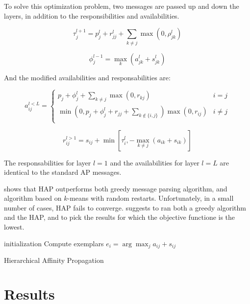 \documentclass{ipol}
\begin{document}
To solve this optimization problem, two messages are passed up and down the
layers, in addition to the responsibilities and availabilities.

\begin{equation}
\tau_j^{l + 1} = p^l_j + r_{jj}^l + \sum_{k \neq j} \max (0, \rho^l_{jk})
\end{equation}

\begin{equation}
\phi_j^{l - 1} = \max_k (a_{jk}^l + s_{jk}^l)
\end{equation}

And the modified availabilities and responsabilities are:

\begin{equation}
a_{ij}^{l < L} = \begin{cases}
	    p_j + \phi_j^l + \sum_{k \neq j} \max(0, r_{kj}) &  i = j \\
	    \min ( 0, p_j + \phi_j^l + r_{jj} + \sum_{k \notin \{i, j\} } ) \max (0, r_{ij}) & i \neq j\\
	 \end{cases}
\end{equation}

\begin{equation*}
r_{ij}^{l > 1} = s_{ij}  + \min [ \tau_i^l, - \max_{k \neq j} (a_{ik} + s_{ik}) ]
\end{equation*}

The responsabilities for layer $l = 1$ and the availabilities for layer $l =
L$ are identical to the standard AP messages.

\cite{hap} shows that HAP outperforms both greedy message parsing algorithm,
and algorithm based on $k$-means with random restarts. Unfortunately, in a
small number of cases, HAP fails to converge. \cite{hap} suggests to ran both
a greedy algorithm and the HAP, and to pick the results for which the
objective functione is the lowest.

\begin{algorithm}[h]
  \SetLine
  initialization\;
  Compute exemplars $e_i = \arg \max_{j} a_{ij} + s_{ij}$ \;
  \caption{Hierarchical Affinity Propagation}
\end{algorithm}

\section{Results}



\end{document}
